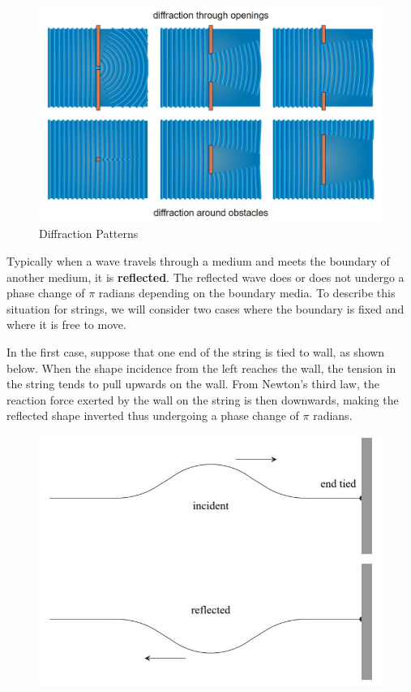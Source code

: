 \begin{figure}[h!]
    \centering
    \includegraphics[scale=0.7]{notes/images/Diffraction-1.JPG}
    \caption{Diffraction Patterns}
    \label{fig:diffraction-patterns}
\end{figure}
\FloatBarrier

Typically when a wave travels through a medium and meets the boundary of another medium, it is \textbf{reflected}. The reflected wave does or does not undergo a phase change of $\pi$ radians depending on the boundary media. To describe this situation for strings, we will consider two cases where the boundary is fixed and where it is free to move. 

In the first case, suppose that one end of the string is tied to wall, as shown below. When the shape incidence from the left reaches the wall, the tension in the string tends to pull upwards on the wall. From Newton's third law, the reaction force exerted by the wall on the string is then downwards, making the reflected shape inverted thus undergoing a phase change of $\pi$ radians. 

\begin{figure}[h!]
    \centering
    \includegraphics[scale=0.9]{notes/images/Reflection-1.JPG}
\end{figure}
\FloatBarrier

